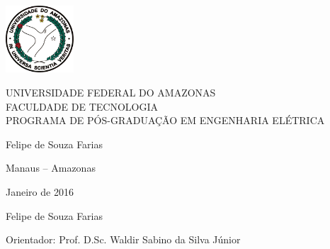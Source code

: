 \begin{center}
\includegraphics[bb=0 0 646 638,height=2.5cm]{ufam.png}

\textsf{\large%
UNIVERSIDADE FEDERAL DO AMAZONAS\\
FACULDADE DE TECNOLOGIA\\
PROGRAMA DE P\'OS-GRADUA\c{C}\~AO EM ENGENHARIA ELÉTRICA}

\vspace*{4cm}
\tittese

\vspace*{4cm}


{\large Felipe de Souza Farias}


\vspace*{3cm}

Manaus -- Amazonas

Janeiro de 2016

\end{center}





\begin{center}
{\large Felipe de Souza Farias}




\vspace*{4cm}
\tittese
\vspace*{2cm}
\descrtese
\vspace*{2cm}


Orientador: Prof. D.Sc. Waldir Sabino da Silva Júnior\\



\end{center}

